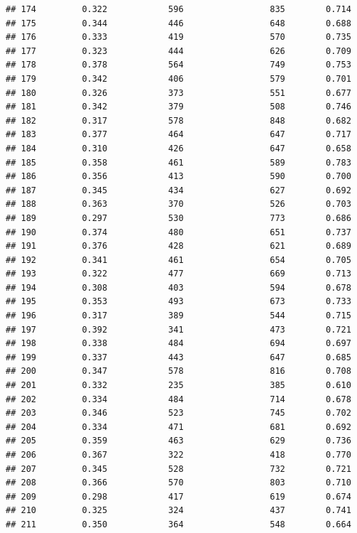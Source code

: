 \documentclass[]{book}
\begin{document}
\begin{verbatim}
## 174         0.322            596                 835        0.714
## 175         0.344            446                 648        0.688
## 176         0.333            419                 570        0.735
## 177         0.323            444                 626        0.709
## 178         0.378            564                 749        0.753
## 179         0.342            406                 579        0.701
## 180         0.326            373                 551        0.677
## 181         0.342            379                 508        0.746
## 182         0.317            578                 848        0.682
## 183         0.377            464                 647        0.717
## 184         0.310            426                 647        0.658
## 185         0.358            461                 589        0.783
## 186         0.356            413                 590        0.700
## 187         0.345            434                 627        0.692
## 188         0.363            370                 526        0.703
## 189         0.297            530                 773        0.686
## 190         0.374            480                 651        0.737
## 191         0.376            428                 621        0.689
## 192         0.341            461                 654        0.705
## 193         0.322            477                 669        0.713
## 194         0.308            403                 594        0.678
## 195         0.353            493                 673        0.733
## 196         0.317            389                 544        0.715
## 197         0.392            341                 473        0.721
## 198         0.338            484                 694        0.697
## 199         0.337            443                 647        0.685
## 200         0.347            578                 816        0.708
## 201         0.332            235                 385        0.610
## 202         0.334            484                 714        0.678
## 203         0.346            523                 745        0.702
## 204         0.334            471                 681        0.692
## 205         0.359            463                 629        0.736
## 206         0.367            322                 418        0.770
## 207         0.345            528                 732        0.721
## 208         0.366            570                 803        0.710
## 209         0.298            417                 619        0.674
## 210         0.325            324                 437        0.741
## 211         0.350            364                 548        0.664

\end{verbatim}
\end{document}

